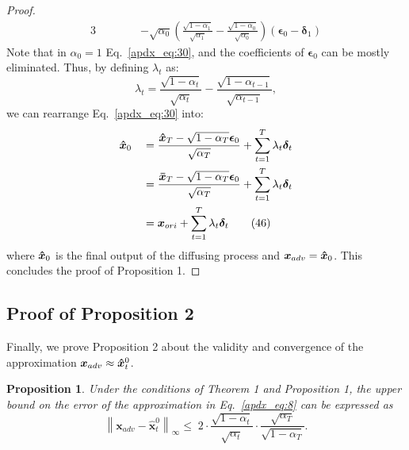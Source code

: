 \documentclass{article}
\newtheorem{proof}{Proof}
\newtheorem{proposition}{Proposition}
\begin{document}
\begin{proof}
\begin{alignat}{3}
& && && -{\sqrt{\alpha_{0}} \left(\frac{\sqrt{1-\alpha_{1}}}{\sqrt{\alpha_{1}}} - \frac{\sqrt{1-\alpha_{0}}}{\sqrt{\alpha_{0}}}\right) \left( \boldsymbol{\epsilon}_0 - \boldsymbol{\delta}_{1} \right)} \tag{44} \label{apdx_eq:30}
\end{alignat}
Note that in $\alpha_0=1$ Eq.~\eqref{apdx_eq:30}, and the coefficients of $\boldsymbol{\epsilon}_0$ can be mostly eliminated. Thus, by defining $\lambda_t$ as:
\begin{equation}\tag{45}
    \lambda_{t} = \frac{\sqrt{1-\alpha_{t}}}{\sqrt{\alpha_{t}}} - \frac{\sqrt{1-{\alpha_{t-1}}}}{\sqrt{\alpha_{t-1}}},
\label{apdx_eq:31}
\end{equation}
we can rearrange Eq.~\eqref{apdx_eq:30} into:
\begin{alignat}{3} \notag
&\boldsymbol{\Hat{x}}_{0}\; & = \; & \frac{\boldsymbol{\Hat{x}}_{T} - \sqrt{1-\alpha_{T}} \boldsymbol{\epsilon}_0}{\sqrt{\alpha_{T}}} + \sum_{t=1}^{T}\lambda_{t}\boldsymbol{\delta}_t \\
& & = \; & \frac{\boldsymbol{\bar{x}}_{T} - \sqrt{1-\alpha_{T}} \boldsymbol{\epsilon}_0}{\sqrt{\alpha_{T}}} + \sum_{t=1}^{T}\lambda_{t}\boldsymbol{\delta}_t  \notag \\
& & = \; & \boldsymbol{{x}}_{ori} + \sum_{t=1}^{T}\lambda_{t}\boldsymbol{\delta}_t  \tag{46}
\label{apdx_eq:32}
\end{alignat}
where $\boldsymbol{\Hat{x}}_{0}$ is the final output of the diffusing process and $\boldsymbol{{x}}_{adv} = \boldsymbol{\Hat{x}}_{0}$. This concludes the proof of Proposition 1.
\end{proof}

\subsection{Proof of Proposition 2}  \label{app:B4}
Finally, we prove Proposition 2 about the validity and convergence of the approximation $\boldsymbol{x}_{adv} \approx \boldsymbol{\Hat{x}}_t^0$.
\begin{proposition}
\label{prop2}
Under the conditions of Theorem 1 and Proposition 1, the upper bound on the error of the approximation in Eq.~\eqref{apdx_eq:8} can be expressed as
    \begin{equation}\tag{47}
        \left\|\boldsymbol{x}_{adv} - \boldsymbol{\hat{x}}_{t}^{0}\right\|_\infty \leq \;2 \cdot \frac{\sqrt{1 - \alpha_t}}{\sqrt{\alpha_t}} \cdot \frac{\sqrt{\alpha_T}}{\sqrt{1 - \alpha_T}}.
    \label{apdx_eq:33}
    \end{equation}
\end{proposition}
\end{document}
